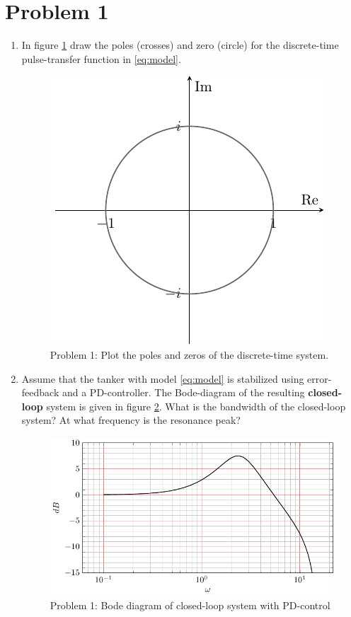 \documentclass{scrartcl}
\begin{document}
\section*{Problem 1}
\label{sec:orgheadline1}
\begin{enumerate}
\item In figure \ref{fig:complex-plane} draw the poles (crosses) and zero (circle) for the  discrete-time pulse-transfer function in \eqref{eq:model}.
\begin{figure}[h]
\begin{center}
\includegraphics[]{complex-plane}
\caption{Problem 1: Plot the poles and zeros of the discrete-time system.}
\label{fig:complex-plane}
\end{center}
\end{figure}
\item Assume that the tanker with model \eqref{eq:model} is stabilized using error-feedback and a PD-controller. The  Bode-diagram of the resulting \textbf{closed-loop} system is  given in figure \ref{fig:bode}. What is the bandwidth of the closed-loop system? At what frequency is the resonance peak? 
\begin{figure}[h]
\begin{center}
\includegraphics[]{bode-closed}
\caption{Problem 1: Bode diagram of closed-loop system with PD-control}
\label{fig:bode}
\end{center}
\end{figure}
\end{enumerate}
\end{document}
